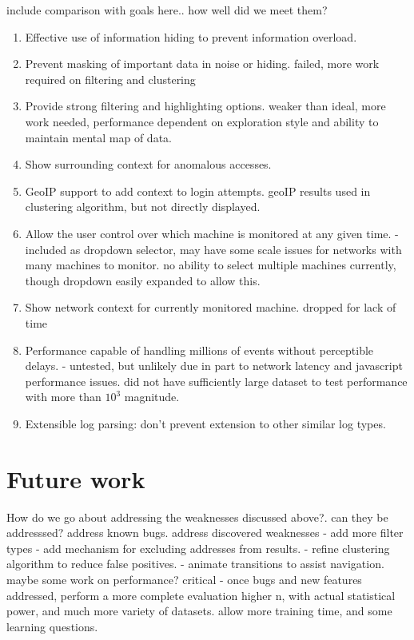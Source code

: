 include comparison with goals here.. how well did we meet them?
\begin{enumerate}
\item{Effective use of information hiding to prevent information overload.}
\item{Prevent masking of important data in noise or hiding. failed, more work required on filtering and clustering}
\item{Provide strong filtering and highlighting options. weaker than ideal, more work needed, performance dependent on exploration style and ability to maintain mental map of data.}
\item{Show surrounding context for anomalous accesses.}
\item{GeoIP support to add context to login attempts. geoIP results used in clustering algorithm, but not directly displayed.}
\item{Allow the user control over which machine is monitored at any given time. -included as dropdown selector, may have some scale issues for networks with many machines to monitor. no ability to select multiple machines currently, though dropdown easily expanded to allow this.}
\item{Show network context for currently monitored machine. dropped for lack of time}
\item{Performance capable of handling millions of events without perceptible delays. - untested, but unlikely due in part to network latency and javascript performance issues. did not have sufficiently large dataset to test performance with more than $10^3$ magnitude.}
\item{Extensible log parsing: don't prevent extension to other similar log types.}
\end{enumerate}

\section{Future work}
How do we go about addressing the weaknesses discussed above?.
can they be addresssed?
address known bugs.
address discovered weaknesses
 - add more filter types
 - add mechanism for excluding addresses from results.
 - refine clustering algorithm to reduce false positives. 
 - animate transitions to assist navigation.
maybe some work on performance?
critical - once bugs and new features addressed, perform a more complete evaluation
higher n, with actual statistical power, and much more variety of datasets. allow more training time, and some learning questions.